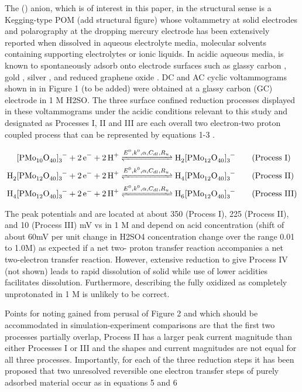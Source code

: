 \documentclass[a4paper, 12pt]{article}
\begin{document}
The () anion, which is of interest in this paper, in the structural sense is a 
Kegging-type POM (add structural figure) whose voltammetry at solid electrodes 
and polarography at the dropping mercury electrode has been extensively reported 
when dissolved in aqueous electrolyte media, molecular solvents containing 
supporting electrolytes or ionic liquids. In acidic aqueous media,   is known to 
spontaneously adsorb onto electrode surfaces such as glassy carbon 
\cite{choi2009adsorption}, gold \cite{choi2009adsorption}, silver 
\cite{choi2009adsorption}, and reduced graphene oxide 
\cite{ding2014phosphomolybdate}.  DC and AC cyclic voltammograms shown in in 
Figure 1 (to be added) were obtained at a glassy carbon (GC) electrode in 1 M 
H2SO. The three  surface confined reduction processes displayed in these 
voltammograms under  the acidic conditions relevant to this study  and 
designated as Processes I, II and III are each overall  two electron-two proton 
coupled process   that can be represented by  equations 1-3 
\cite{chen2013fabrication}.  

\begin{align}
    \cee{[PMo10O40]3- + 2e- + 2H+ &<=>[E^0,k^0,\alpha, C_{dl}, R_u] 
    H2[PMo12O40]3-} \qquad \text{(Process I)} \label{eq:process_I}\\
    \cee{H2[PMo12O40]3- + 2e- + 2H+ &<=>[E^0,k^0,\alpha, C_{dl}, R_u] 
    H4[PMo12O40]3-} \qquad \text{(Process II)} \\
    \cee{H4[PMo12O40]3- + 2e- + 2H+ &<=>[E^0,k^0,\alpha, C_{dl}, R_u] 
    H6[PMo12O40]3-} \qquad \text{(Process III)}
\end{align}


The peak potentials and are located   at about 350 (Process I), 225 (Process 
II), and 10 (Process III) mV vs  in 1 M  and depend on 
acid concentration (shift of about 60mV per unit change in H2SO4 concentration 
change over the range 0.01 to 1.0M) as expected if a net two- proton transfer 
reaction accompanies a net two-electron transfer reaction. However, extensive 
reduction to give Process IV (not shown) leads to rapid dissolution of solid 
while use of lower acidities facilitates dissolution. Furthermore, describing 
the fully oxidized \ce{[PMo12O40]} as completely unprotonated in 1 M  
is unlikely to be correct.  

Points for noting gained from perusal of Figure 2 and which should be 
accommodated in simulation-experiment comparisons are that the first two 
processes partially overlap, Process II has a larger peak current magnitude than 
either Processes I or III and the shapes and current magnitudes are not equal 
for all three processes. Importantly, for each of the three reduction steps it 
has been proposed \cite{batchelor2015recent,lopez2014two, 
gonzalez2013reversible,mirceski2016measuring,saveant2006elements,evans2008one} 
that two unresolved reversible one electron transfer steps of purely adsorbed 
material occur as in equations 5 and 6 
\end{document}
